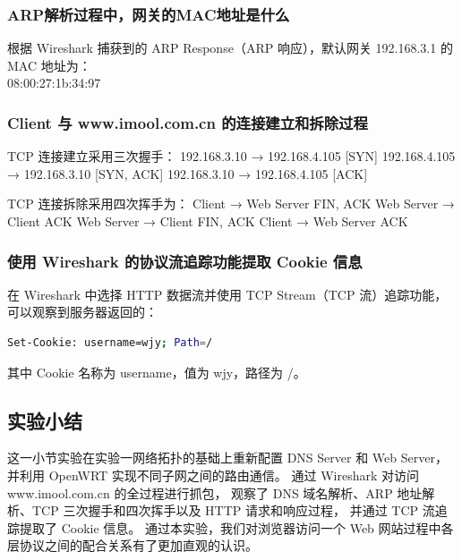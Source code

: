 \subsubsection{ARP解析过程中，网关的MAC地址是什么}
根据 Wireshark 捕获到的 ARP Response（ARP 响应），默认网关 192.168.3.1 的 MAC 地址为：\\
08:00:27:1b:34:97

\subsubsection{Client 与 www.imool.com.cn 的连接建立和拆除过程}
TCP 连接建立采用三次握手：
192.168.3.10 → 192.168.4.105    [SYN]
192.168.4.105 → 192.168.3.10    [SYN, ACK]
192.168.3.10 → 192.168.4.105    [ACK]

TCP 连接拆除采用四次挥手为：
Client → Web Server       FIN, ACK
Web Server → Client       ACK
Web Server → Client       FIN, ACK
Client → Web Server       ACK

\subsubsection{使用 Wireshark 的协议流追踪功能提取 Cookie 信息}
在 Wireshark 中选择 HTTP 数据流并使用 TCP Stream（TCP 流）追踪功能，
可以观察到服务器返回的：
\begin{lstlisting}[language=bash,caption={cookie的显示}]
Set-Cookie: username=wjy; Path=/
\end{lstlisting}
其中 Cookie 名称为 username，值为 wjy，路径为 /。

\subsection{实验小结}
这一小节实验在实验一网络拓扑的基础上重新配置 DNS Server 和 Web Server，
并利用 OpenWRT 实现不同子网之间的路由通信。
通过 Wireshark 对访问 www.imool.com.cn 的全过程进行抓包，
观察了 DNS 域名解析、ARP 地址解析、TCP 三次握手和四次挥手以及 HTTP 请求和响应过程，
并通过 TCP 流追踪提取了 Cookie 信息。
通过本实验，我们对浏览器访问一个 Web 网站过程中各层协议之间的配合关系有了更加直观的认识。

